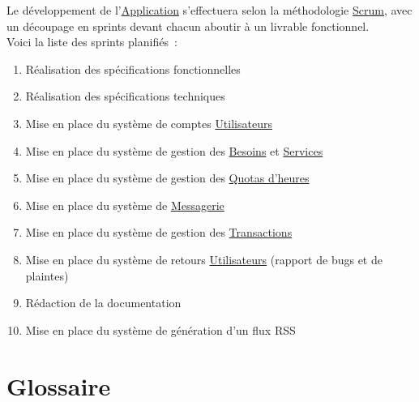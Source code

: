 \documentclass[french]{article}
\begin{document}
		Le développement de l’\hyperlink{application}{Application} s’effectuera
		 selon la méthodologie
		 \href{https://fr.wikipedia.org/wiki/Scrum_(méthode)}{Scrum}, avec un
		 découpage en sprints devant chacun aboutir à un livrable fonctionnel.\\
		Voici la liste des sprints planifiés :
		\begin{enumerate}
			\item Réalisation des spécifications fonctionnelles
			\item Réalisation des spécifications techniques
			\item Mise en place du système de comptes
			 \hyperlink{utilisateur}{Utilisateurs}
			\item Mise en place du système de gestion des \hyperlink{besoin}{Besoins}
			 et \hyperlink{service}{Services}
			\item Mise en place du système de gestion des
			 \hyperlink{quota}{Quotas d’heures}
			\item Mise en place du système de \hyperlink{messagerie}{Messagerie}
			\item Mise en place du système de gestion des
			 \hyperlink{transaction}{Transactions}
			\item Mise en place du système de retours
			 \hyperlink{utilisateur}{Utilisateurs} (rapport de bugs et de plaintes)
			\item Rédaction de la documentation
			\item Mise en place du système de génération d’un flux RSS
		\end{enumerate}
		
	\newpage
	\section{Glossaire}
		
\end{document}
